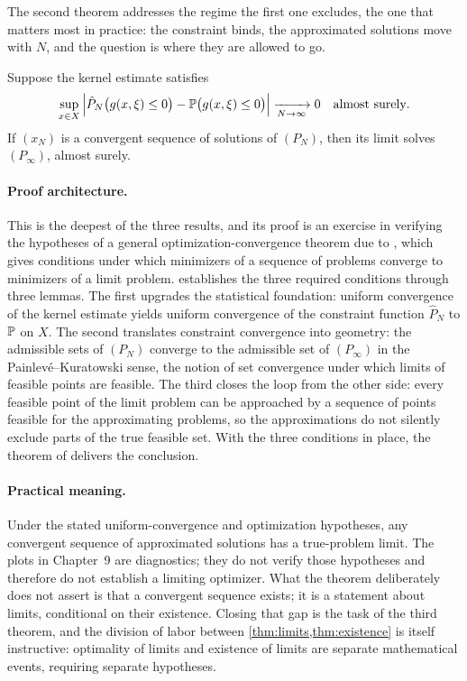 The second theorem addresses the regime the first one excludes, the one
that matters most in practice: the constraint binds, the approximated
solutions move with $N$, and the question is where they are allowed to
go.

\begin{theorem}
\label{thm:limits}
Suppose the kernel estimate satisfies
\[
  \sup_{x\in X}\left|\hat{P}_N\bigl(g(x,\xi)\leq 0\bigr)
  - \mathbb{P}\bigl(g(x,\xi)\leq 0\bigr)\right| \xrightarrow[N\to\infty]{} 0
\quad\text{almost surely}.
\]
If $(x_N)$ is a convergent sequence of solutions of $(P_N)$,
then its limit solves $(P_\infty)$, almost surely.
\end{theorem}

\paragraph*{Proof architecture.} This is the deepest of the three results, and
its proof is an exercise in verifying the hypotheses of a general
optimization-convergence theorem due to \citet{alvarezmena2005}, which
gives conditions under which minimizers of a sequence of problems
converge to minimizers of a limit problem. \citet{schuster2025}
establishes the three required conditions through three lemmas. The
first upgrades the statistical foundation: uniform convergence of the
kernel estimate yields uniform convergence of the constraint function
$\hat{P}_N$ to $\mathbb{P}$ on $X$. The second translates constraint
convergence into geometry: the admissible sets of $(P_N)$ converge to
the admissible set of $(P_\infty)$ in the Painlev\'e--Kuratowski sense,
the notion of set convergence under which limits of feasible points are
feasible. The third closes the loop from the other side: every feasible
point of the limit problem can be approached by a sequence of points
feasible for the approximating problems, so the approximations do not
silently exclude parts of the true feasible set. With the three
conditions in place, the theorem of \citet{alvarezmena2005} delivers the
conclusion.

\paragraph*{Practical meaning.} Under the stated uniform-convergence and
optimization hypotheses, any convergent sequence of approximated solutions
has a true-problem limit. The plots in Chapter~9 are diagnostics; they
do not verify those hypotheses and therefore do not establish a limiting
optimizer. What the theorem deliberately
does not assert is that a convergent sequence exists; it is a statement
about limits, conditional on their existence. Closing that gap is the
task of the third theorem, and the division of labor between
\cref{thm:limits,thm:existence} is itself instructive: optimality of
limits and existence of limits are separate mathematical events,
requiring separate hypotheses.

